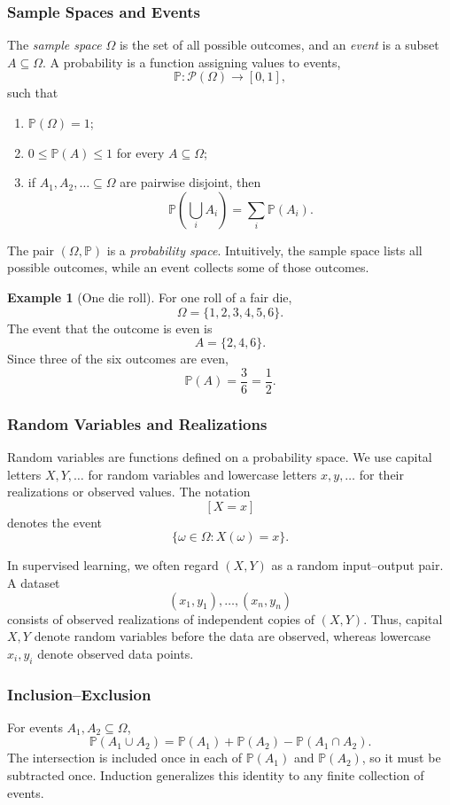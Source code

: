 \documentclass[12pt,oneside]{book}
\numberwithin{equation}{section}
\theoremstyle{definition}
\newtheorem{example}{Example}[section]
\theoremstyle{plain}
\theoremstyle{remark}
\newcommand{\powerset}{\mathcal{P}}
\begin{document}
\subsubsection{Sample Spaces and Events}
The \emph{sample space} $\Omega$ is the set of all possible outcomes, and an \emph{event} is a subset $A\subseteq\Omega$. A probability is a function assigning values to events,
\[
\mathbb{P}\colon\powerset(\Omega)\to[0,1],
\]
such that
\begin{enumerate}
    \item $\mathbb{P}(\Omega)=1$;
    \item $0\leq\mathbb{P}(A)\leq1$ for every $A\subseteq\Omega$;
    \item if $A_1,A_2,\ldots\subseteq\Omega$ are pairwise disjoint, then
    \[
    \mathbb{P}\left(\bigcup_i A_i\right)
    =\sum_i\mathbb{P}(A_i).
    \]
\end{enumerate}
The pair $(\Omega,\mathbb{P})$ is a \emph{probability space}. Intuitively, the sample space lists all possible outcomes, while an event collects some of those outcomes.

\begin{example}[One die roll]
For one roll of a fair die,
\[
\Omega=\{1,2,3,4,5,6\}.
\]
The event that the outcome is even is
\[
A=\{2,4,6\}.
\]
Since three of the six outcomes are even,
\[
\mathbb{P}(A)=\frac{3}{6}=\frac{1}{2}.
\]
\end{example}

\subsubsection{Random Variables and Realizations}
Random variables are functions defined on a probability space. We use capital letters $X,Y,\ldots$ for random variables and lowercase letters $x,y,\ldots$ for their realizations or observed values. The notation
\[
[X=x]
\]
denotes the event
\[
\{\omega\in\Omega:X(\omega)=x\}.
\]

In supervised learning, we often regard $(X,Y)$ as a random input--output pair. A dataset
\[
(x_1,y_1),\ldots,(x_n,y_n)
\]
consists of observed realizations of independent copies of $(X,Y)$. Thus, capital $X,Y$ denote random variables before the data are observed, whereas lowercase $x_i,y_i$ denote observed data points.

\subsubsection{Inclusion--Exclusion}
For events $A_1,A_2\subseteq\Omega$,
\[
\mathbb{P}(A_1\cup A_2)
=\mathbb{P}(A_1)+\mathbb{P}(A_2)-\mathbb{P}(A_1\cap A_2).
\]
The intersection is included once in each of $\mathbb{P}(A_1)$ and $\mathbb{P}(A_2)$, so it must be subtracted once. Induction generalizes this identity to any finite collection of events.
\end{document}
